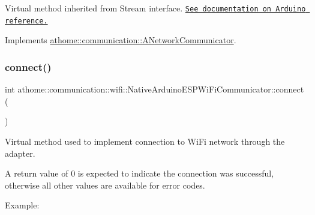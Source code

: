 Virtual method inherited from Stream interface. \href{https://www.arduino.cc/reference/en/language/functions/communication/stream/streamavailable/}{\tt See documentation on Arduino reference.} 

Implements \mbox{\hyperlink{classathome_1_1communication_1_1_a_network_communicator_a2bf367d03c98e8523fda71dd43ffa2fb}{athome\+::communication\+::\+A\+Network\+Communicator}}.

\mbox{\label{classathome_1_1communication_1_1wifi_1_1_native_arduino_e_s_p_wi_fi_communicator_abc07f2d953fa91f86b8919858e10bbd7}} 
\subsubsection{\texorpdfstring{connect()}{connect()}}
{\footnotesize\ttfamily int athome\+::communication\+::wifi\+::\+Native\+Arduino\+E\+S\+P\+Wi\+Fi\+Communicator\+::connect (\begin{DoxyParamCaption}{ }\end{DoxyParamCaption})\hspace{0.3cm}{\ttfamily [virtual]}}

Virtual method used to implement connection to Wi\+Fi network through the adapter.

A return value of 0 is expected to indicate the connection was successful, otherwise all other values are available for error codes.

Example\+:


